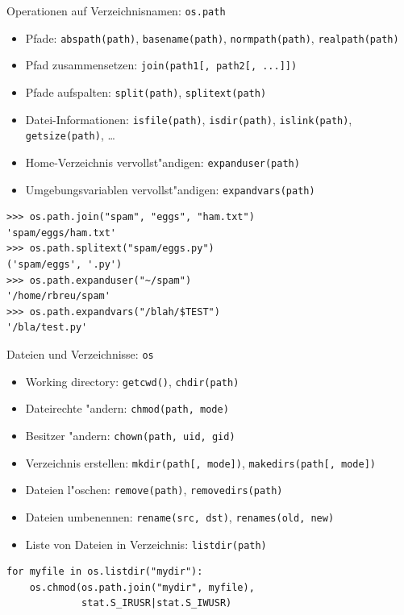\begin{frame}[fragile]{Operationen auf Verzeichnisnamen: \texttt{os.path}}
\begin{itemize}
\item Pfade: \texttt{abspath(path)}, \texttt{basename(path)}, \texttt{normpath(path)}, \texttt{realpath(path)}
\item Pfad zusammensetzen: \texttt{join(path1[, path2[, ...]])}
\item Pfade aufspalten: \texttt{split(path)}, \texttt{splitext(path)}
\item Datei-Informationen: \texttt{isfile(path)}, \texttt{isdir(path)}, \texttt{islink(path)}, \texttt{getsize(path)}, \dots
\item Home-Verzeichnis vervollst"andigen: \texttt{expanduser(path)}
\item Umgebungsvariablen vervollst"andigen: \texttt{expandvars(path)}
\end{itemize} 
\begin{lstlisting}[style=Shell]
>>> os.path.join("spam", "eggs", "ham.txt")
'spam/eggs/ham.txt'
>>> os.path.splitext("spam/eggs.py")
('spam/eggs', '.py')
>>> os.path.expanduser("~/spam")
'/home/rbreu/spam'
>>> os.path.expandvars("/blah/$TEST")
'/bla/test.py'
\end{lstlisting}%
\end{frame}

\begin{frame}[fragile]{Dateien und Verzeichnisse: \texttt{os}}
\begin{itemize}
\item Working directory: \lstinline{getcwd()}, \lstinline{chdir(path)}
\item Dateirechte "andern: \lstinline{chmod(path, mode)}
\item Besitzer "andern: \lstinline{chown(path, uid, gid)}
\item Verzeichnis erstellen: \lstinline{mkdir(path[, mode])}, \lstinline{makedirs(path[, mode])}
\item Dateien l"oschen: \lstinline{remove(path)}, \lstinline{removedirs(path)}
\item Dateien umbenennen: \lstinline{rename(src, dst)}, \lstinline{renames(old, new)}
\item Liste von Dateien in Verzeichnis: \lstinline{listdir(path)}
\end{itemize}
\begin{lstlisting}[style=Python]
for myfile in os.listdir("mydir"):
    os.chmod(os.path.join("mydir", myfile), 
             stat.S_IRUSR|stat.S_IWUSR)
\end{lstlisting}
\end{frame} 

